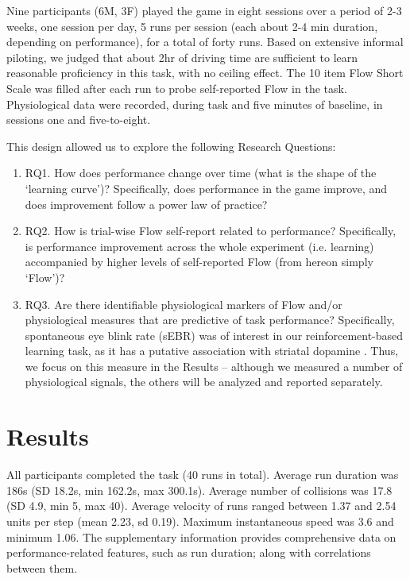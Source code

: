 \documentclass[fleqn,10pt]{wlscirep}
\begin{document}
Nine participants (6M, 3F) played the game in eight sessions over a period of 2-3 weeks, one session per day, 5 runs per session (each about 2-4 min duration, depending on performance), for a total of forty runs. Based on extensive informal piloting, we judged that about 2hr of driving time are sufficient to learn reasonable proficiency in this task, with no ceiling effect. The 10 item Flow Short Scale \cite{Engeser2008} was filled after each run to probe self-reported Flow in the task. Physiological data were recorded, during task and five minutes of baseline, in sessions one and five-to-eight.

This design allowed us to explore the following Research Questions:
\begin{enumerate}
	\item RQ1. How does performance change over time (what is the shape of the `learning curve')? Specifically, does performance in the game improve, and does improvement follow a power law of practice?

	\item RQ2. How is trial-wise Flow self-report related to performance? Specifically, is performance improvement across the whole experiment (i.e. learning) accompanied by higher levels of self-reported Flow (from hereon simply `Flow')?

	\item RQ3. Are there identifiable physiological markers of Flow and/or physiological measures that are predictive of task performance? Specifically, spontaneous eye blink rate (sEBR) was of interest in our reinforcement-based learning task, as it has a putative association with striatal dopamine \cite{Slagter2012}. Thus, we focus on this measure in the Results -- although we measured a number of physiological signals, the others will be analyzed and reported separately.

\end{enumerate}

\section*{Results}
All participants completed the task (40 runs in total). Average run duration was 186s (SD 18.2s, min 162.2s, max 300.1s). Average number of collisions was 17.8 (SD 4.9, min 5, max 40). Average velocity of runs ranged between 1.37 and 2.54 units per step (mean 2.23, sd 0.19). Maximum instantaneous speed was 3.6 and minimum 1.06. The supplementary information provides comprehensive data on performance-related features, such as run duration; along with correlations between them.
\end{document}
